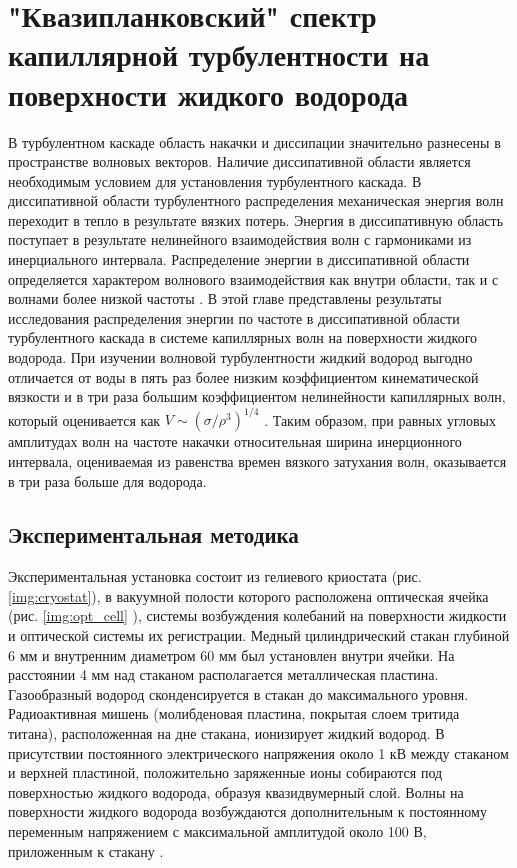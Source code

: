 \chapter{"Квазипланковский" спектр капиллярной турбулентности на поверхности жидкого водорода}


В турбулентном каскаде область накачки и диссипации значительно разнесены в пространстве волновых векторов. Наличие диссипативной области является необходимым условием для установления турбулентного каскада. В диссипативной области турбулентного распределения механическая энергия волн переходит в тепло в результате вязких потерь. Энергия в диссипативную область поступает в результате нелинейного взаимодействия волн с гармониками из инерциального интервала. Распределение энергии в диссипативной области определяется характером волнового взаимодействия как внутри области, так и с волнами более низкой частоты \cite{Ryzhenkova1990}. 
В этой главе представлены результаты исследования распределения энергии по частоте в диссипативной области турбулентного каскада в системе капиллярных волн на поверхности жидкого водорода. При изучении волновой турбулентности жидкий водород выгодно отличается от воды в пять раз более низким коэффициентом кинематической вязкости и в три раза большим коэффициентом нелинейности капиллярных волн, который оценивается как $V \sim (\sigma / \rho^3)^{1/4}$ . Таким образом, при равных угловых амплитудах волн на частоте накачки относительная ширина инерционного интервала, оцениваемая из равенства времен вязкого затухания волн, оказывается в три раза больше для водорода. 

\section{Экспериментальная методика} %
Экспериментальная установка состоит из гелиевого криостата (рис. \ref{img:cryostat}), в вакуумной полости которого расположена оптическая ячейка (рис. \ref{img:opt_cell} ), системы возбуждения колебаний на поверхности жидкости и оптической системы их регистрации. Медный цилиндрический стакан глубиной 6 мм и внутренним диаметром 60 мм был установлен внутри ячейки. На расстоянии 4 мм над стаканом располагается металлическая пластина. Газообразный водород сконденсируется в стакан до максимального уровня. Радиоактивная мишень (молибденовая пластина, покрытая слоем тритида титана), расположенная на дне стакана, ионизирует жидкий водород. В присутствии постоянного электрического напряжения около 1 кВ между стаканом и верхней пластиной, положительно заряженные ионы собираются под поверхностью жидкого водорода, образуя квазидвумерный слой. Волны на поверхности жидкого водорода возбуждаются дополнительным к постоянному переменным напряжением с максимальной амплитудой около 100 В, приложенным к стакану  \cite{Brazhnikov_IET}.
 

